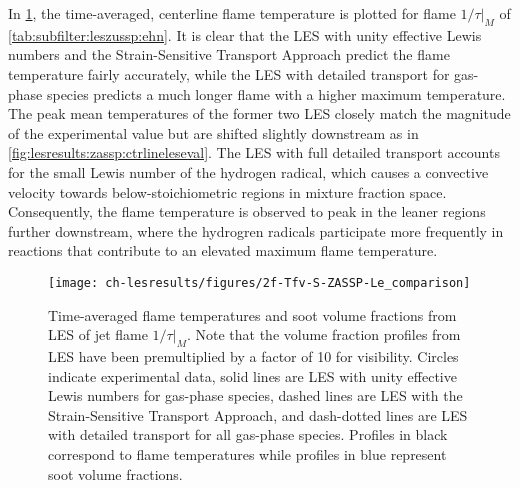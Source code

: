 In \cref{fig:lesresults:ssta:f2lecomparison}, the time-averaged, centerline flame temperature is plotted for flame $1/\tau|_M$ of \cref{tab:subfilter:leszussp:ehn}. It is clear that the LES with unity effective Lewis numbers and the Strain-Sensitive Transport Approach predict the flame temperature fairly accurately, while the LES with detailed transport for gas-phase species predicts a much longer flame with a higher maximum temperature. The peak mean temperatures of the former two LES closely match the magnitude of the experimental value but are shifted slightly downstream as in \cref{fig:lesresults:zassp:ctrlineleseval}. The LES with full detailed transport accounts for the small Lewis number of the hydrogen radical, which causes a convective velocity towards below-stoichiometric regions in mixture fraction space. Consequently, the flame temperature is observed to peak in the leaner regions further downstream, where the hydrogren radicals participate more frequently in reactions that contribute to an elevated maximum flame temperature. %

\begin{figure}[H]
  \centering
  \texttt{[image: ch-lesresults/figures/2f-Tfv-S-ZASSP-Le\_comparison]}
  \caption[Centerline $\langle T \rangle$ \& $\langle f_V \rangle$ from LES of Flame $1/\tau|_M$ with Various Transport Approaches]{Time-averaged flame temperatures and soot volume fractions from LES of jet flame $1/\tau|_M$. Note that the volume fraction profiles from LES have been premultiplied by a factor of 10 for visibility. Circles indicate experimental data, solid lines are LES with unity effective Lewis numbers for gas-phase species, dashed lines are LES with the Strain-Sensitive Transport Approach, and dash-dotted lines are LES with detailed transport for all gas-phase species. Profiles in black correspond to flame temperatures while profiles in blue represent soot volume fractions.}
  \label{fig:lesresults:ssta:f2lecomparison}
\end{figure}

